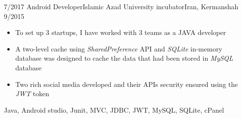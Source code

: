 \begin{experiences}
  \emptySeparator
 \experience
    {7/2017}   {Android Developer}{Islamic Azad University incubator}{Iran, Kermanshah}
    {9/2015} { \begin{itemize}
                          \item To set up 3 startups, I have worked with 3 teams as a JAVA developer
                       \item A two-level cache using \emph{SharedPreference} API and \emph{SQLite} in-memory database was designed to cache the data that had been stored in  \emph{MySQL} database
                       \item Two rich social media developed and their APIs security ensured using the \emph{JWT} token
                      \end{itemize}}
                    {Java, Android studio, Junit, MVC, JDBC, JWT, MySQL, SQLite, cPanel}
  \emptySeparator
\end{experiences}
